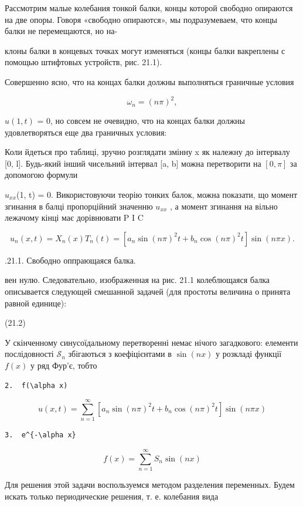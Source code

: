 \documentclass[
  ukrainian,
]{article}
\begin{document}
Рассмотрим малые колебания тонкой балки, концы которой свободно
опираются на две опоры. Говоря «свободно опираются», мы подразумеваем,
что концы балки не перемещаются, но на-

клоны балки в концевых точках могут изменяться (концы балки вакреплены с
помощью штифтовых устройств, рис. 21.1).

Совершенно ясно, что на концах балки должны выполняться граничные
условия

\[
\omega_n = (n\pi)^2,
\]

\(u(1, t)\) = 0, но совсем не очевидно, что на концах балки должны
удовлетворяться еще два граничных условия:

Коли йдеться про таблиці, зручно розглядати змінну x як належну до
інтервалу {[}0, l{]}. Будь-який інший чисельний інтервал {[}a, b{]}
можна перетворити на \([0, \pi]\) за допомогою формули

\(u_{xx}\)(1, t) = 0. Використовуючи теорію тонких балок, можна
показати, що момент згинання в балці пропорційний значенню \(u_{xx}\) ,
а момент згинання на вільно лежачому кінці має дорівнювати P I C

\[
u_n(x, t) = X_n(x) T_n(t) = [a_n \sin(n\pi)^2 t + b_n \cos(n\pi)^2 t] \sin(n\pi x).
\]

.21.1. Свободно оппрающаяся балка.

вен нулю. Следовательно, изображенная на рис. 21.1 колеблющаяся балка
описывается следующей смешанной задачей (для простоты величина о принята
равной единице):

(21.2)

У скінченному синусоїдальному перетворенні немає нічого загадкового:
елементи послідовності \(\mathcal{S}_n\) збігаються з коефіцієнтами в
\(\sin(nx)\) у розкладі функції \(f(x)\) у ряд Фур'є, тобто

\begin{verbatim}
2.  f(\alpha x) 
\end{verbatim}

\[
u(x, t) = \sum_{n=1}^{\infty} \left[ a_n \sin(n\pi)^2 t + b_n \cos(n\pi)^2 t \right] \sin(n\pi x)
\]

\begin{verbatim}
3.  e^{-\alpha x} 
\end{verbatim}

\[
f(x) = \sum_{n=1}^{\infty} S_n \sin(nx)
\]

Для решения этой задачи воспользуемся методом разделения переменных.
Будем искать только периодические решения, т. е. колебания вида
\end{document}
